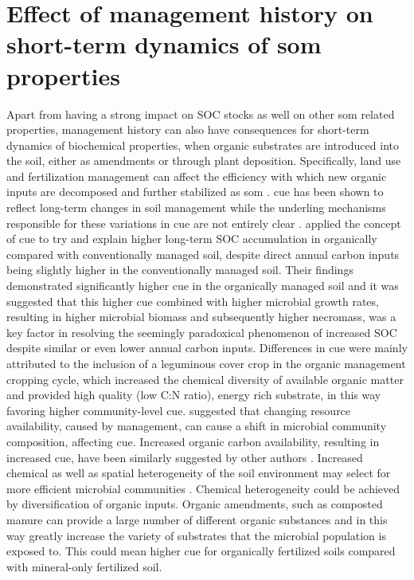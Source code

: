 \section{Effect of management history on short-term dynamics of \gls{som} properties}

		Apart from having a strong impact on SOC stocks as well on other \gls{som} related properties, management history can also have consequences for short-term dynamics of biochemical properties, when organic substrates are introduced into the soil, either as amendments or through plant deposition. Specifically, land use and fertilization management can affect the efficiency with which new organic inputs are decomposed and further stabilized as \gls{som} \citep{lee2014}. \gls{cue} has been shown to reflect long-term changes in soil management  while the underling mechanisms responsible for these variations in \gls{cue} are not entirely clear \citep{kallenbach2019}.
		\citep{kallenbach2015} applied the concept of \gls{cue} to try and explain higher long-term SOC accumulation in organically compared with conventionally managed soil, despite direct annual carbon inputs being slightly higher in the conventionally managed soil. Their findings demonstrated significantly higher \gls{cue} in the organically managed soil and it was suggested that this higher \gls{cue} combined with higher microbial growth rates, resulting in higher microbial biomass and subsequently higher necromass, was a key factor in resolving the seemingly paradoxical phenomenon of increased SOC despite similar or even lower annual carbon inputs. Differences in \gls{cue} were mainly attributed to the inclusion of a leguminous cover crop in the organic management cropping cycle, which increased the chemical diversity of available organic matter and provided high quality (low C:N ratio), energy rich substrate, in this way favoring higher community-level \gls{cue}.
		\citet{roller2015} suggested that changing resource availability, caused by management, can cause a shift in microbial community composition, affecting \gls{cue}. Increased organic carbon availability, resulting in increased \gls{cue}, have been similarly suggested by other authors \citep{cotrufo2013}.
		Increased chemical as well as spatial heterogeneity of the soil environment may select for more efficient microbial communities \citep{pfeiffer2001, nunan2017}. Chemical heterogeneity could be achieved by diversification of organic inputs. Organic amendments, such as composted manure can provide a large number of different organic substances \citep{zbytniewski2005} and in this way greatly increase the  variety of substrates that the microbial population is exposed to. This could mean higher \gls{cue} for organically fertilized soils compared with mineral-only fertilized soil.
